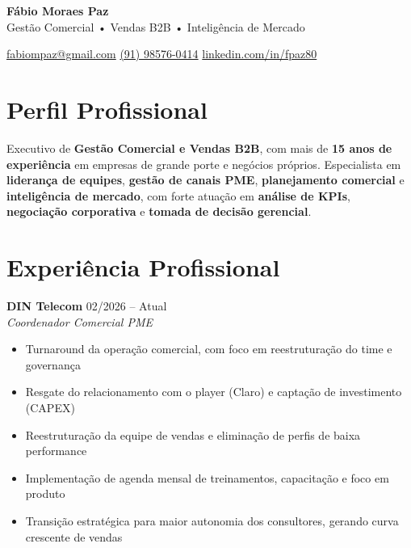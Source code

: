 \documentclass[11pt,a4paper]{article}
\begin{document}

\vspace{-0.8cm}

{\Huge\color{white}\textbf{Fábio Moraes Paz}} \\[10pt]
{\Large\color{white}Gestão Comercial • Vendas B2B • Inteligência de Mercado}

\vspace{10pt}

{\color{white}
\href{mailto:fabiompaz@gmail.com}{fabiompaz@gmail.com} \quad
\href{https://wa.me/5591985760414}{(91) 98576-0414} \quad
\href{https://linkedin.com/in/fpaz80}{linkedin.com/in/fpaz80}
}

\vspace{36pt}

\section*{Perfil Profissional}

Executivo de \textbf{Gestão Comercial e Vendas B2B}, com mais de
\textbf{15 anos de experiência} em empresas de grande porte e negócios próprios.
Especialista em \textbf{liderança de equipes}, \textbf{gestão de canais PME},
\textbf{planejamento comercial} e \textbf{inteligência de mercado},
com forte atuação em \textbf{análise de KPIs}, \textbf{negociação corporativa}
e \textbf{tomada de decisão gerencial}.

\section*{Experiência Profissional}

\textbf{DIN Telecom} \hfill {\color{Muted}02/2026 -- Atual} \\
\textit{Coordenador Comercial PME}

\begin{itemize}[leftmargin=1.4em]
\item Turnaround da operação comercial, com foco em reestruturação do time e governança
\item Resgate do relacionamento com o player (Claro) e captação de investimento (CAPEX)
\item Reestruturação da equipe de vendas e eliminação de perfis de baixa performance
\item Implementação de agenda mensal de treinamentos, capacitação e foco em produto
\item Transição estratégica para maior autonomia dos consultores, gerando curva crescente de vendas
\end{itemize}
\end{document}
